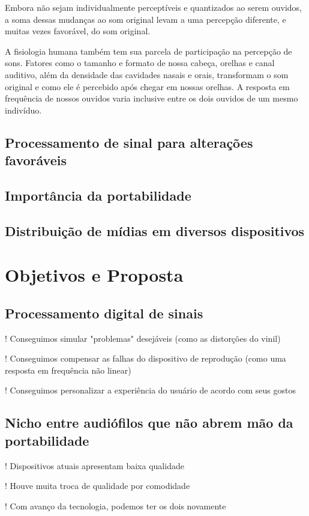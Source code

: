 Embora não sejam individualmente perceptíveis e quantizados ao serem ouvidos, a soma dessas mudanças ao som original levam a uma percepção diferente, e muitas vezes favorável, do som original.


A fisiologia humana também tem sua parcela de participação na percepção de sons. Fatores como o tamanho e formato de nossa cabeça, orelhas e canal auditivo, além da densidade das cavidades nasais e orais, transformam o som original e como ele é percebido após chegar em nossas orelhas.  A resposta em frequência de nossos ouvidos varia inclusive entre os dois ouvidos de um mesmo indivíduo.


\subsection{Processamento de sinal para alterações favoráveis}\label{subsec:processamentoSinalAlteracoesFavoraveis}
\subsection{Importância da portabilidade}\label{subsec:importanciaPortabilidade}
\subsection{Distribuição de mídias em diversos dispositivos}\label{subsec:distribuicaoMidiaDiversosDispositivos}

\section{Objetivos e Proposta}
\subsection{Processamento digital de sinais}
! Conseguimos simular "problemas" desejáveis (como as distorções do vinil)

! Conseguimos compensar as falhas do dispositivo de reprodução (como uma resposta em frequência não linear)

! Conseguimos personalizar a experiência do usuário de acordo com seus gostos
\subsection{Nicho entre audiófilos que não abrem mão da portabilidade}
! Dispositivos atuais apresentam baixa qualidade

! Houve muita troca de qualidade por comodidade

! Com avanço da tecnologia, podemos ter os dois novamente

